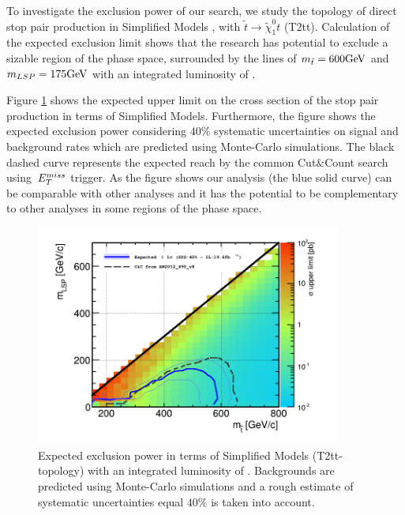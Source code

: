 To investigate the exclusion power of our search, we study the topology of direct stop pair production  in Simplified Models \cite{alves:sms}, with $\tilde{t}\to \tilde{\chi}^0_1 t$ (T2tt). 
Calculation of the expected exclusion limit shows that  
the research has potential to exclude 
a sizable region of the phase space, surrounded by the lines of $m_{\tilde{t}} = 600\rm{GeV}$ and $m_{LSP} = 175\rm{GeV}$ with an integrated luminosity of \IL.



Figure \ref{fig:limit_20inf} shows the expected upper limit on the cross section of the stop pair production in terms of Simplified Models. 
Furthermore, the figure shows the expected exclusion power considering 
$40\%$ systematic uncertainties on signal and background rates which are predicted using Monte-Carlo simulations. The black 
dashed curve represents the expected reach by the common Cut$\&$Count \cite{cutandcountAN} search using $\,{E_T^{miss}}$ trigger. 
As the figure shows our analysis (the blue solid curve) can be comparable with other analyses and   
it has the potential to be complementary to other analyses in some regions of the phase space.  



\begin{linenomath}
\begin{figure}[h]
\centering
\includegraphics[width=0.9\textwidth,keepaspectratio=true]{StatisticsFig/Exc_131030_196ifb.png}
\caption{Expected exclusion power in terms of Simplified Models (T2tt-topology) with an integrated luminosity of \IL. Backgrounds are predicted using Monte-Carlo simulations and a rough estimate of systematic uncertainties equal 
$40\%$ is taken into account.}
\label{fig:limit_20inf}
\end{figure}
\end{linenomath}


